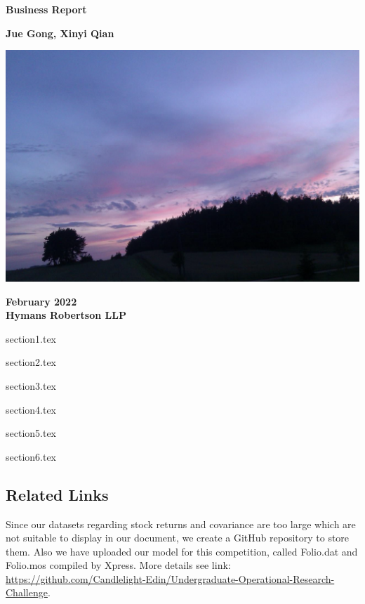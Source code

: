 \documentclass[12pt]{article}
\begin{document}
\begin{titlepage}

\begin{center}
    \textbf{\Huge \bfseries Business Report}
    
    \vspace*{1cm}
    
    \textbf{\large Jue Gong, Xinyi Qian}
    
    \vspace{1.5cm}

    \includegraphics[width=15cm]{./Figures/titlepage.png}

    \vfill
    
    \textbf{February 2022\\
    Hymans Robertson LLP}
\end{center}

\end{titlepage}


\newpage

\tableofcontents
\newpage

{section1.tex}

{section2.tex}

{section3.tex}

{section4.tex}

{section5.tex}

{section6.tex}

\begin{appendices}
\section{Related Links}
Since our datasets regarding stock returns and covariance are too large which are not suitable to display in our document, we create a GitHub repository to store them. Also we have uploaded our model for this competition, called Folio.dat and Folio.mos compiled by Xpress. More details see link: \url{https://github.com/Candlelight-Edin/Undergraduate-Operational-Research-Challenge}.
\end{appendices}
\end{document}
